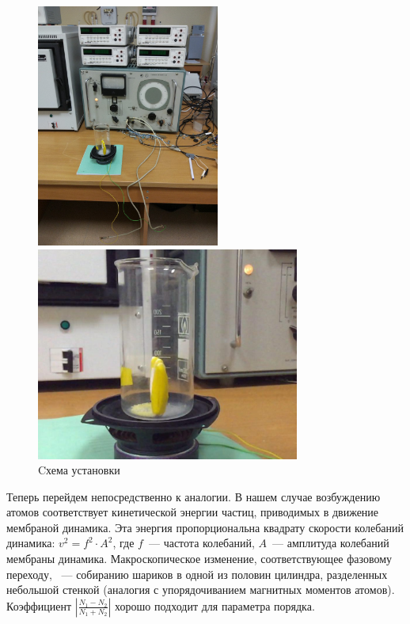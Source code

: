 \documentclass[a4paper, 12pt]{article}
\begin{document}
\begin{figure}[h]
	\begin{center}
		\begin{minipage}{0.45 \linewidth}
			\includegraphics[height=8cm]{img/scheme.jpg}
		\end{minipage}
		\qquad
		\begin{minipage}{0.45 \linewidth}
			\includegraphics[height=7cm]{img/zoom_scheme.jpg}
		\end{minipage}
	\end{center}
	\caption{Cхема установки}
\end{figure}

Теперь перейдем непосредственно к аналогии. В нашем случае возбуждению атомов соответствует кинетической энергии частиц, приводимых в движение мембраной динамика. Эта энергия пропорциональна квадрату скорости колебаний динамика: $v^2 = f^2 \cdot A^2$, где $f$~--- частота колебаний, $A$~--- амплитуда колебаний мембраны динамика. Макроскопическое изменение, соответствующее фазовому переходу, ~--- собиранию шариков в одной из половин цилиндра, разделенных небольшой стенкой (аналогия с упорядочиванием магнитных моментов атомов). Коэффициент  $\left\lvert \frac{N_1 - N_2}{N_1 + N_2} \right\rvert$ хорошо подходит для параметра порядка.
\end{document}
